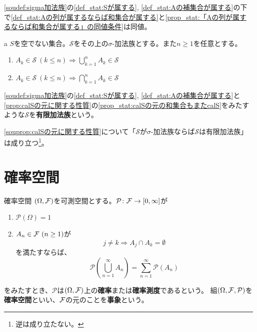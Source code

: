 \documentclass[dvipdfmx, leqno]{jsbook}
\begin{document}
\begin{souremark}
    \cref{soudef:sigma加法族}の\ref{def_stat:Sが属する}, \ref{def_stat:Aの補集合が属する}の下で\ref{def_stat:Aの列が属するならば和集合が属する}と\ref{prop_stat:「Aの列が属するならば和集合が属する」の同値条件}は同値。
\end{souremark}

\begin{souprop}{a}\label{souprop:calSの元に関する性質}
    $S$を空でない集合。$\mathcal{S}$をその上の$\sigma$-加法族とする。また$n\ge 1$を任意とする。
\begin{enumerate}
    \item\label{prop_stat:calSの元の和集合もまたcalS} $A_k\in \mathcal{S}\ (k\le n)\Rightarrow \bigcup_{k= 1}^n A_k\in \mathcal{S}$
    \item $A_k\in \mathcal{S}\ (k\le n)\Rightarrow \bigcap_{k= 1}^n A_k\in \mathcal{S}$
\end{enumerate}
\end{souprop}

\begin{souremark}
    \cref{soudef:sigma加法族}の\ref{def_stat:Sが属する}, \ref{def_stat:Aの補集合が属する}と\ref{prop:calSの元に関する性質}の\ref{prop_stat:calSの元の和集合もまたcalS}をみたすような$\mathcal{S}$を\textbf{有限加法族}という。
\end{souremark}
\begin{souremark}
    \cref{souprop:calSの元に関する性質}について「$\mathcal{S}$が$\sigma$-加法族ならば$\mathcal{S}$は有限加法族」は成り立つ\footnote{逆は成り立たない。}。
\end{souremark}

\section{確率空間}
\begin{soudef}{確率空間}\label{soudef:確率空間}
    $(\Omega, \mathcal{F})$を可測空間とする。$\mathcal{P}\colon \mathcal{F}\to [0, \infty]$が
\begin{enumerate}
    \item\label{def_stat:確率の和は1} $\mathcal{P}(\Omega)= 1$
    \item\label{def_stat:各部分が互いに素} $A_n\in \mathcal{F}\ (n\ge 1)$が
\begin{equation*}
    j\ne k\Rightarrow A_j\cap A_k= \emptyset
\end{equation*}
    を満たすならば、
\begin{equation*}
    \mathcal{P}\left(\bigcup_{n= 1}^\infty A_n\right)= \sum_{n= 1}^\infty \mathcal{P}(A_n)
\end{equation*}
\end{enumerate}
    をみたすとき、$\mathcal{P}$は$(\Omega, \mathcal{F})$上の\textbf{確率}または\textbf{確率測度}であるという。
    組$(\Omega, \mathcal{F}, \mathcal{P})$を\textbf{確率空間}といい、$\mathcal{F}$の元のことを\textbf{事象}という。
\end{soudef}
\end{document}
